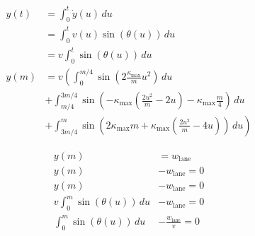 \documentclass{article}
\begin{document}
\begin{align}
  y\left(t\right) &= \int_{0}^{t} \dot{y}\left(u\right)\,du\\
  &= \int_{0}^{t} v\left(u\right)\sin\left(\theta\left(u\right)\right)\,du\\
  &= v \int_{0}^{t} \sin\left(\theta\left(u\right)\right)\,du\\
  y\left(m\right) &= v \left(\int_{0}^{m/4} \sin\left(2\frac{\kappa_{\max}}{m} u^2\right)\,du\right.\\
  &+ \int_{m/4}^{3m/4} \sin\left(-\kappa_{\max}\left(\frac{2u^{2}}{m}-2u\right) - \kappa_{\max}\frac{m}{4}\right)\,du\\
  &+ \left.\int_{3m/4}^{m} \sin\left(2\kappa_{\max}m + \kappa_{\max}\left(\frac{2u^{2}}{m}-4u\right)\right)\,du\right)
\end{align}

\begin{align}
  y\left(m\right) &= w_{\mathrm{lane}}\\
  y\left(m\right) &- w_{\mathrm{lane}} = 0\\
  y\left(m\right) &- w_{\mathrm{lane}} = 0\\
  v \int_{0}^{m} \sin\left(\theta\left(u\right)\right)\,du &- w_{\mathrm{lane}} = 0\\
  \int_{0}^{m} \sin\left(\theta\left(u\right)\right)\,du &- \frac{w_{\mathrm{lane}}}{v} = 0
\end{align}
\end{document}
